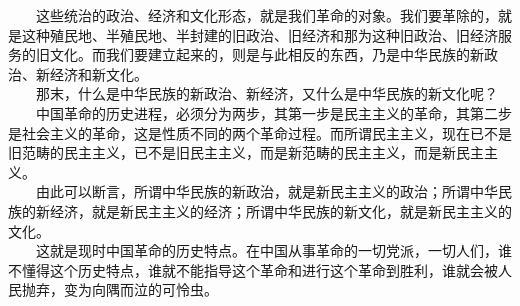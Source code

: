 \documentclass[cn,11pt,chinese]{elegantbook}
\begin{document}
　　这些统治的政治、经济和文化形态，就是我们革命的对象。我们要革除的，就是这种殖民地、半殖民地、半封建的旧政治、旧经济和那为这种旧政治、旧经济服务的旧文化。而我们要建立起来的，则是与此相反的东西，乃是中华民族的新政治、新经济和新文化。\\
　　那末，什么是中华民族的新政治、新经济，又什么是中华民族的新文化呢？\\
　　中国革命的历史进程，必须分为两步，其第一步是民主主义的革命，其第二步是社会主义的革命，这是性质不同的两个革命过程。而所谓民主主义，现在已不是旧范畴的民主主义，已不是旧民主主义，而是新范畴的民主主义，而是新民主主义。\\
　　由此可以断言，所谓中华民族的新政治，就是新民主主义的政治；所谓中华民族的新经济，就是新民主主义的经济；所谓中华民族的新文化，就是新民主主义的文化。\\
　　这就是现时中国革命的历史特点。在中国从事革命的一切党派，一切人们，谁不懂得这个历史特点，谁就不能指导这个革命和进行这个革命到胜利，谁就会被人民抛弃，变为向隅而泣的可怜虫。\\
\end{document}
